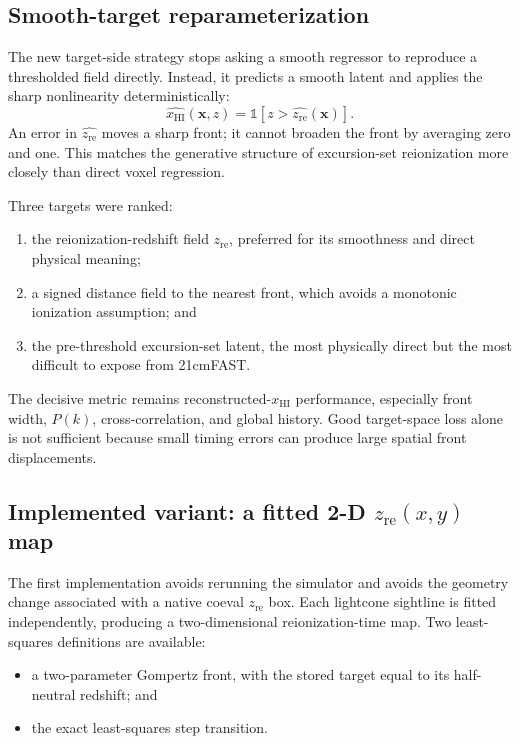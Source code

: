 \documentclass[11pt,a4paper]{article}
\newcommand{\xhi}{x_{\mathrm{HI}}}
\newcommand{\zre}{z_{\mathrm{re}}}
\begin{document}
\subsection{Smooth-target reparameterization}

The new target-side strategy stops asking a smooth regressor to reproduce a
thresholded field directly. Instead, it predicts a smooth latent and applies
the sharp nonlinearity deterministically:
\begin{equation}
\widehat{\xhi}(\mathbf{x},z)
=\mathbb{1}\!\left[z>\widehat{\zre}(\mathbf{x})\right].
\end{equation}
An error in \(\widehat{\zre}\) moves a sharp front; it cannot broaden the front
by averaging zero and one. This matches the generative structure of
excursion-set reionization more closely than direct voxel regression.

Three targets were ranked:
\begin{enumerate}
  \item the reionization-redshift field \(\zre\), preferred for its smoothness
  and direct physical meaning;
  \item a signed distance field to the nearest front, which avoids a monotonic
  ionization assumption; and
  \item the pre-threshold excursion-set latent, the most physically direct but
  the most difficult to expose from 21cmFAST.
\end{enumerate}

The decisive metric remains reconstructed-\(\xhi\) performance, especially
front width, \(P(k)\), cross-correlation, and global history. Good target-space
loss alone is not sufficient because small timing errors can produce large
spatial front displacements.

\subsection{Implemented variant: a fitted 2-D
\texorpdfstring{\(\zre(x,y)\)}{z-re(x,y)} map}

The first implementation avoids rerunning the simulator and avoids the geometry
change associated with a native coeval \(\zre\) box. Each lightcone sightline
is fitted independently, producing a two-dimensional reionization-time map.
Two least-squares definitions are available:
\begin{itemize}
  \item a two-parameter Gompertz front, with the stored target equal to its
  half-neutral redshift; and
  \item the exact least-squares step transition.
\end{itemize}
\end{document}
